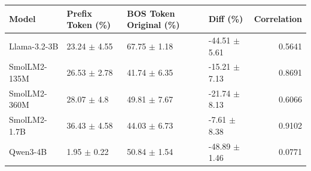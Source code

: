 \begin{tabular}{llllr}
\toprule
 Model        & Prefix Token (\%)          & BOS Token Original (\%)    & Diff (\%)                   &   Correlation \\
\midrule
 Llama-3.2-3B & 23.24 {\small $\pm$ 4.55} & 67.75 {\small $\pm$ 1.18} & -44.51 {\small $\pm$ 5.61} &        0.5641 \\
 SmolLM2-135M & 26.53 {\small $\pm$ 2.78} & 41.74 {\small $\pm$ 6.35} & -15.21 {\small $\pm$ 7.13} &        0.8691 \\
 SmolLM2-360M & 28.07 {\small $\pm$ 4.8}  & 49.81 {\small $\pm$ 7.67} & -21.74 {\small $\pm$ 8.13} &        0.6066 \\
 SmolLM2-1.7B & 36.43 {\small $\pm$ 4.58} & 44.03 {\small $\pm$ 6.73} & -7.61 {\small $\pm$ 8.38}  &        0.9102 \\
 Qwen3-4B     & 1.95 {\small $\pm$ 0.22}  & 50.84 {\small $\pm$ 1.54} & -48.89 {\small $\pm$ 1.46} &        0.0771 \\
\bottomrule
\end{tabular}

